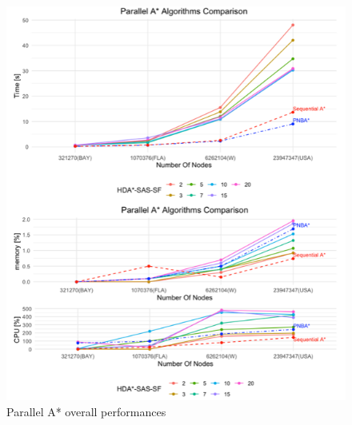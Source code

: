 \documentclass[twocolumn, switch]{article} %
\begin{document}
\begin{figure}[ht!]
  \centering
  \includegraphics[width=1\linewidth]{others/allalgo.png}
  \caption{Parallel A* overall performances}
  \label{allalgo}
\end{figure}

\normalsize


\end{document}
